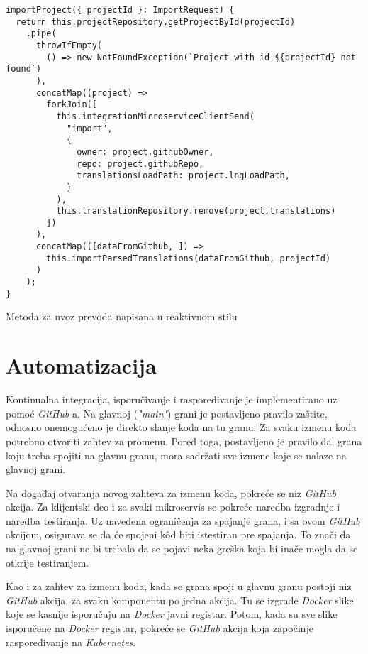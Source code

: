 \begin{listing}[h]
  \centering
  \begin{verbatim}
importProject({ projectId }: ImportRequest) {
  return this.projectRepository.getProjectById(projectId)
    .pipe(
      throwIfEmpty(
        () => new NotFoundException(`Project with id ${projectId} not found`)
      ),
      concatMap((project) =>
        forkJoin([
          this.integrationMicroserviceClientSend(
            "import",
            {
              owner: project.githubOwner,
              repo: project.githubRepo,
              translationsLoadPath: project.lngLoadPath,
            }
          ),
          this.translationRepository.remove(project.translations)
        ])
      ),
      concatMap(([dataFromGithub, ]) =>
        this.importParsedTranslations(dataFromGithub, projectId)
      )
    );
}  
  \end{verbatim}
\caption{Metoda za uvoz prevoda napisana u reaktivnom stilu}
\label{code:rxjs}
\end{listing}


\section{Automatizacija}
Kontinualna integracija, isporučivanje i raspoređivanje je implementirano uz 
pomoć \textit{GitHub}-a. Na glavnoj (\textit{"main"}) grani 
je postavljeno pravilo zaštite, odnosno onemogućeno je direkto slanje 
koda na tu granu. Za svaku izmenu koda potrebno otvoriti zahtev za 
promenu. Pored toga, postavljeno je pravilo da, grana koju treba spojiti 
na glavnu granu, mora sadržati sve izmene koje se nalaze na glavnoj grani.

Na događaj otvaranja novog zahteva za izmenu koda, pokreće se niz 
\textit{GitHub} akcija. Za klijentski deo i za svaki mikroservis 
se pokreće naredba izgradnje i naredba testiranja. Uz navedena 
ograničenja za spajanje grana, i sa ovom \textit{GitHub} akcijom, 
osigurava se da će spojeni kôd biti istestiran pre spajanja. To znači da 
na glavnoj grani ne bi trebalo da se pojavi neka greška koja bi inače mogla 
da se otkrije testiranjem.

Kao i za zahtev za izmenu koda, kada se grana spoji u glavnu granu 
postoji niz \textit{GitHub} akcija, za svaku komponentu po jedna akcija.
Tu se izgrade \textit{Docker} slike koje se kasnije isporučuju na 
\textit{Docker} javni registar. Potom, kada su sve slike isporučene na 
\textit{Docker} registar, pokreće se \textit{GitHub} akcija koja započinje 
raspoređivanje na \textit{Kubernetes}.

